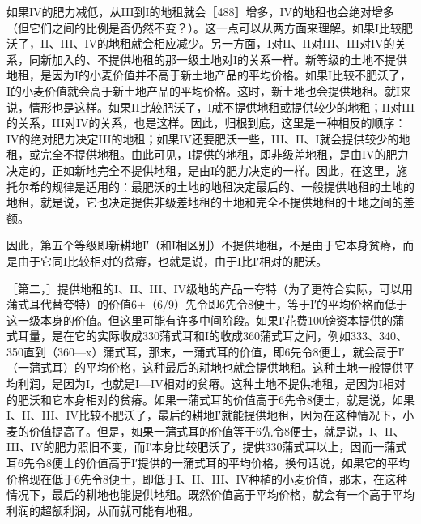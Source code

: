 如果IV的肥力减低，从III到I的地租就会［488］增多，IV的地租也会绝对增多（但它们之间的比例是否仍然不变？）。这一点可以从两方面来理解。如果I比较肥沃了，II、III、IV的地租就会相应减少。另一方面，I对II、II对III、III对IV的关系，同新加入的、不提供地租的那一级土地对I的关系一样。新等级的土地不提供地租，是因为I的小麦价值并不高于新土地产品的平均价格。如果I比较不肥沃了，I的小麦价值就会高于新土地产品的平均价格。这时，新土地也会提供地租。就I来说，情形也是这样。如果II比较肥沃了，I就不提供地租或提供较少的地租；II对III的关系，III对IV的关系，也是这样。因此，归根到底，这里是一种相反的顺序：IV的绝对肥力决定III的地租；如果IV还要肥沃一些，III、II、I就会提供较少的地租，或完全不提供地租。由此可见，I提供的地租，即非级差地租，是由IV的肥力决定的，正如新地完全不提供地租，是由I的肥力决定的一样。因此，在这里，施托尔希的规律是适用的：最肥沃的土地的地租决定最后的、一般提供地租的土地的地租，就是说，它也决定提供非级差地租的土地和完全不提供地租的土地之间的差额。

因此，第五个等级即新耕地I′（和I相区别）不提供地租，不是由于它本身贫瘠，而是由于它同I比较相对的贫瘠，也就是说，由于I比I′相对的肥沃。

［第二，］提供地租的I、II、III、IV级地的产品一夸特（为了更符合实际，可以用蒲式耳代替夸特）的价值6+（6/9）先令即6先令8便士，等于I′的平均价格而低于这一级本身的价值。但这里可能有许多中间阶段。如果I′花费100镑资本提供的蒲式耳量，是在它的实际收成330蒲式耳和I的收成360蒲式耳之间，例如333、340、350直到（360—x）蒲式耳，那末，一蒲式耳的价值，即6先令8便士，就会高于I′（一蒲式耳）的平均价格，这种最后的耕地也就会提供地租。这种土地一般提供平均利润，是因为I，也就是I—IV相对的贫瘠。这种土地不提供地租，是因为I相对的肥沃和它本身相对的贫瘠。如果一蒲式耳的价值高于6先令8便士，就是说，如果I、II、III、IV比较不肥沃了，最后的耕地I′就能提供地租，因为在这种情况下，小麦的价值提高了。但是，如果一蒲式耳的价值等于6先令8便士，就是说，I、II、III、IV的肥力照旧不变，而I′本身比较肥沃了，提供330蒲式耳以上，因而一蒲式耳6先令8便士的价值高于I′提供的一蒲式耳的平均价格，换句话说，如果它的平均价格现在低于6先令8便士，即低于I、II、III、IV种植的小麦价值，那末，在这种情况下，最后的耕地也能提供地租。既然价值高于平均价格，就会有一个高于平均利润的超额利润，从而就可能有地租。

